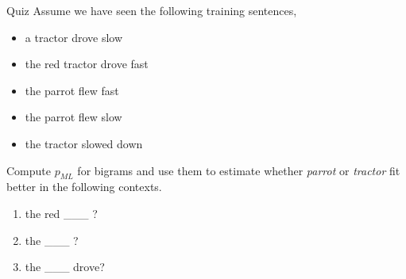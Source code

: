 \documentclass{beamer}
\begin{document}
\begin{frame}{Quiz}
  Assume we have seen the following training sentences, 

  \begin{itemize}
  \item     a tractor drove slow
  \item     the red tractor drove fast
  \item     the parrot flew fast

  \item the parrot flew slow
    
    \item the tractor slowed down

  \end{itemize}


  Compute $p_{ML}$ for bigrams and use them to estimate whether \textit{parrot} or \textit{tractor}  fit better in the following contexts.


  \begin{enumerate}
    \item the  red \_\_\_ ?
    \item the  \_\_\_ ?

    \item the  \_\_\_ drove?
  \end{enumerate}

\end{frame}
\end{document}
